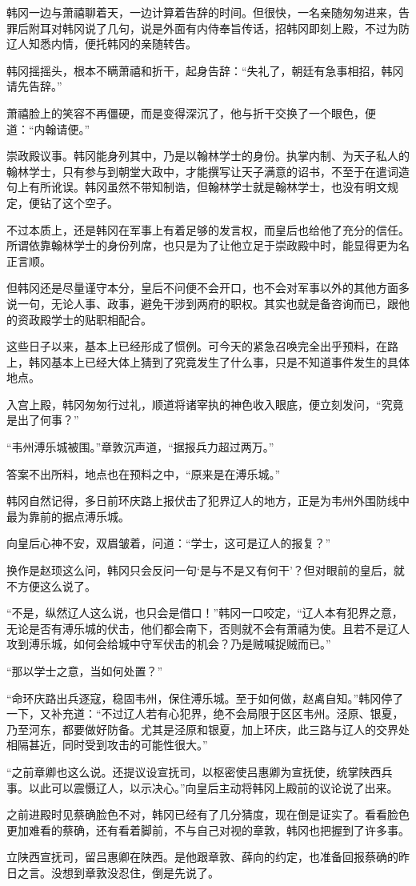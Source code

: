 韩冈一边与萧禧聊着天，一边计算着告辞的时间。但很快，一名亲随匆匆进来，告罪后附耳对韩冈说了几句，说是外面有内侍奉旨传话，招韩冈即刻上殿，不过为防辽人知悉内情，便托韩冈的亲随转告。

韩冈摇摇头，根本不瞒萧禧和折干，起身告辞：“失礼了，朝廷有急事相招，韩冈请先告辞。”

萧禧脸上的笑容不再僵硬，而是变得深沉了，他与折干交换了一个眼色，便道：“内翰请便。”

崇政殿议事。韩冈能身列其中，乃是以翰林学士的身份。执掌内制、为天子私人的翰林学士，只有参与到朝堂大政中，才能撰写让天子满意的诏书，不至于在遣词造句上有所讹误。韩冈虽然不带知制诰，但翰林学士就是翰林学士，也没有明文规定，便钻了这个空子。

不过本质上，还是韩冈在军事上有着足够的发言权，而皇后也给他了充分的信任。所谓依靠翰林学士的身份列席，也只是为了让他立足于崇政殿中时，能显得更为名正言顺。

但韩冈还是尽量谨守本分，皇后不问便不会开口，也不会对军事以外的其他方面多说一句，无论人事、政事，避免干涉到两府的职权。其实也就是备咨询而已，跟他的资政殿学士的贴职相配合。

这些日子以来，基本上已经形成了惯例。可今天的紧急召唤完全出乎预料，在路上，韩冈基本上已经大体上猜到了究竟发生了什么事，只是不知道事件发生的具体地点。

入宫上殿，韩冈匆匆行过礼，顺道将诸宰执的神色收入眼底，便立刻发问，“究竟是出了何事？”

“韦州溥乐城被围。”章敦沉声道，“据报兵力超过两万。”

答案不出所料，地点也在预料之中，“原来是在溥乐城。”

韩冈自然记得，多日前环庆路上报伏击了犯界辽人的地方，正是为韦州外围防线中最为靠前的据点溥乐城。

向皇后心神不安，双眉皱着，问道：“学士，这可是辽人的报复？”

换作是赵顼这么问，韩冈只会反问一句‘是与不是又有何干’？但对眼前的皇后，就不方便这么说了。

“不是，纵然辽人这么说，也只会是借口！”韩冈一口咬定，“辽人本有犯界之意，无论是否有溥乐城的伏击，他们都会南下，否则就不会有萧禧为使。且若不是辽人攻到溥乐城，如何会给城中守军伏击的机会？乃是贼喊捉贼而已。”

“那以学士之意，当如何处置？”

“命环庆路出兵逐寇，稳固韦州，保住溥乐城。至于如何做，赵禼自知。”韩冈停了一下，又补充道：“不过辽人若有心犯界，绝不会局限于区区韦州。泾原、银夏，乃至河东，都要做好防备。尤其是泾原和银夏，加上环庆，此三路与辽人的交界处相隔甚近，同时受到攻击的可能性很大。”

“之前章卿也这么说。还提议设宣抚司，以枢密使吕惠卿为宣抚使，统掌陕西兵事。以此可以震慑辽人，以示决心。”向皇后主动将韩冈上殿前的议论说了出来。

之前进殿时见蔡确脸色不对，韩冈已经有了几分猜度，现在倒是证实了。看看脸色更加难看的蔡确，还有看着脚前，不与自己对视的章敦，韩冈也把握到了许多事。

立陕西宣抚司，留吕惠卿在陕西。是他跟章敦、薛向的约定，也准备回报蔡确的昨日之言。没想到章敦没忍住，倒是先说了。
